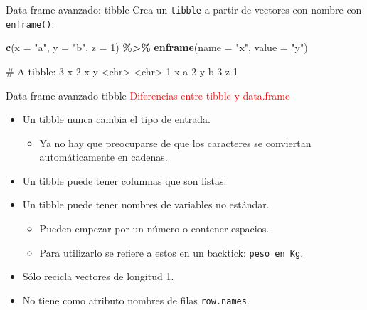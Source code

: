 \documentclass[
  ignorenonframetext,
  aspectratio=169]{beamer}
\newenvironment{Shaded}{\begin{snugshade}}{\end{snugshade}}
\newcommand{\AttributeTok}[1]{\textcolor[rgb]{0.13,0.29,0.53}{#1}}
\newcommand{\DecValTok}[1]{\textcolor[rgb]{0.00,0.00,0.81}{#1}}
\newcommand{\FunctionTok}[1]{\textcolor[rgb]{0.13,0.29,0.53}{\textbf{#1}}}
\newcommand{\NormalTok}[1]{#1}
\newcommand{\SpecialCharTok}[1]{\textcolor[rgb]{0.81,0.36,0.00}{\textbf{#1}}}
\newcommand{\StringTok}[1]{\textcolor[rgb]{0.31,0.60,0.02}{#1}}
\providecommand{\tightlist}{%
  \setlength{\itemsep}{0pt}\setlength{\parskip}{0pt}}
\let\oldverbatim\verbatim
\let\endoldverbatim\endverbatim
\renewenvironment{verbatim}{\tiny\oldverbatim}{\endoldverbatim}
\newcommand\red[1]{\textcolor{red}{#1}}
\begin{document}
\begin{frame}[fragile]{Data frame avanzado: tibble}
\label{data-frame-avanzado-tibble-3}
Crea un \texttt{tibble} a partir de vectores con nombre con
\texttt{enframe()}.

\begin{Shaded}
\begin{Highlighting}[]
\FunctionTok{c}\NormalTok{(}\AttributeTok{x =} \StringTok{"a"}\NormalTok{, }\AttributeTok{y =} \StringTok{"b"}\NormalTok{, }\AttributeTok{z =} \DecValTok{1}\NormalTok{) }\SpecialCharTok{\%\textgreater{}\%}
  \FunctionTok{enframe}\NormalTok{(}\AttributeTok{name =} \StringTok{"x"}\NormalTok{, }\AttributeTok{value =} \StringTok{"y"}\NormalTok{)}
\end{Highlighting}
\end{Shaded}

\begin{verbatim}
# A tibble: 3 x 2
  x     y    
  <chr> <chr>
1 x     a    
2 y     b    
3 z     1    
\end{verbatim}
\end{frame}

\begin{frame}[fragile]{Data frame avanzado tibble}
\label{data-frame-avanzado-tibble-4}
\red{Diferencias entre tibble y data.frame}

\begin{itemize}
\item
  Un tibble nunca cambia el tipo de entrada.

  \begin{itemize}
  \tightlist
  \item
    Ya no hay que preocuparse de que los caracteres se conviertan
    automáticamente en cadenas.
  \end{itemize}
\item
  Un tibble puede tener columnas que son listas.
\item
  Un tibble puede tener nombres de variables no estándar.

  \begin{itemize}
  \tightlist
  \item
    Pueden empezar por un número o contener espacios.
  \item
    Para utilizarlo se refiere a estos en un backtick:
    \texttt{peso\ en\ Kg}.
  \end{itemize}
\item
  Sólo recicla vectores de longitud 1.
\item
  No tiene como atributo nombres de filas \texttt{row.names}.
\end{itemize}
\end{frame}
\end{document}
